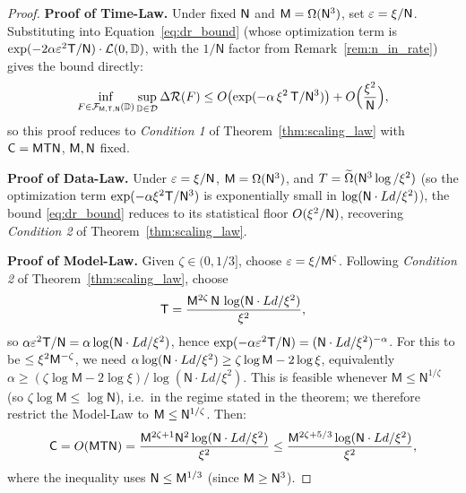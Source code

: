 \documentclass[11pt]{article}
\theoremstyle{plain}
\newcommand{\wt}{\widetilde}
\begin{document}
\begin{proof}
    {\bf Proof of Time-Law.} Under fixed ${\sf N}$ and ${\sf M} = \Omega({\sf N}^3)$, set $\varepsilon = \xi/{\sf N}$. Substituting into Equation~\eqref{eq:dr_bound} (whose optimization term is $\exp(-2\alpha\varepsilon^2{\sf T}/\mathsf{N})\cdot{\cal L}(0,\mathbb{D})$, with the $1/\mathsf{N}$ factor from Remark~\ref{rem:n_in_rate}) gives the bound directly:
    \begin{align*}
        \inf_{F \in {\cal F}_{\sf M, T, N}(\mathbb{D})} \sup_{\mathbb{D} \in {\cal D}}  \Delta{\cal R}(F)
        \leq O\!\left(\exp(-\alpha\,\xi^2\,{\sf T}/{\sf N}^3)\right) + O\Big(\frac{\xi^2}{\sf N}\Big),
    \end{align*}
    so this proof reduces to {\it Condition 1} of Theorem~\ref{thm:scaling_law} with ${\sf C} = {\sf MTN}$, ${\sf M}, {\sf N}$ fixed.

    {\bf Proof of Data-Law.} Under $\varepsilon = \xi/{\sf N}$, ${\sf M} = \Omega({\sf N}^3)$, and $T = \wt\Omega({\sf N}^3\log/\xi^2)$ (so the optimization term $\exp(-\alpha\xi^2{\sf T}/{\sf N}^3)$ is exponentially small in $\log({\sf N}\cdot Ld/\xi^2)$), the bound \eqref{eq:dr_bound} reduces to its statistical floor $O(\xi^2/{\sf N})$, recovering {\it Condition 2} of Theorem~\ref{thm:scaling_law}.

    {\bf Proof of Model-Law.} Given $\zeta \in (0, 1/3]$, choose $\varepsilon = \xi/{\sf M}^\zeta$. Following {\it Condition 2} of Theorem~\ref{thm:scaling_law}, choose
    \begin{align*}
        {\sf T} = \frac{{\sf M}^{2\zeta}\,\mathsf{N}\,\log({\sf N}\cdot Ld/\xi^2)}{\xi^2},
    \end{align*}
    so $\alpha\varepsilon^2 {\sf T}/\mathsf{N} = \alpha\log({\sf N}\cdot Ld/\xi^2)$, hence $\exp(-\alpha\varepsilon^2 {\sf T}/\mathsf{N}) = ({\sf N}\cdot Ld/\xi^2)^{-\alpha}$. For this to be $\leq \xi^2 {\sf M}^{-\zeta}$, we need $\alpha\log({\sf N}\cdot Ld/\xi^2) \ge \zeta\log\mathsf{M} - 2\log\xi$, equivalently $\alpha \ge (\zeta\log\mathsf{M}-2\log\xi)/\log(\mathsf{N}\cdot Ld/\xi^2)$. This is feasible whenever $\mathsf{M}\le \mathsf{N}^{1/\zeta}$ (so $\zeta\log\mathsf{M}\le \log\mathsf{N}$), i.e.\ in the regime stated in the theorem; we therefore restrict the Model-Law to ${\sf M}\le{\sf N}^{1/\zeta}$. Then:
    \begin{align*}
        {\sf C} = O({\sf MTN}) = \frac{{\sf M}^{2\zeta+1}{\sf N}^2\log({\sf N}\cdot Ld/\xi^2)}{\xi^2}
        \leq \frac{{\sf M}^{2\zeta + 5/3}\log({\sf N}\cdot Ld/\xi^2)}{\xi^2},
    \end{align*}
    where the inequality uses ${\sf N} \leq {\sf M}^{1/3}$ (since ${\sf M} \geq {\sf N}^3$).


\end{proof}
\end{document}
